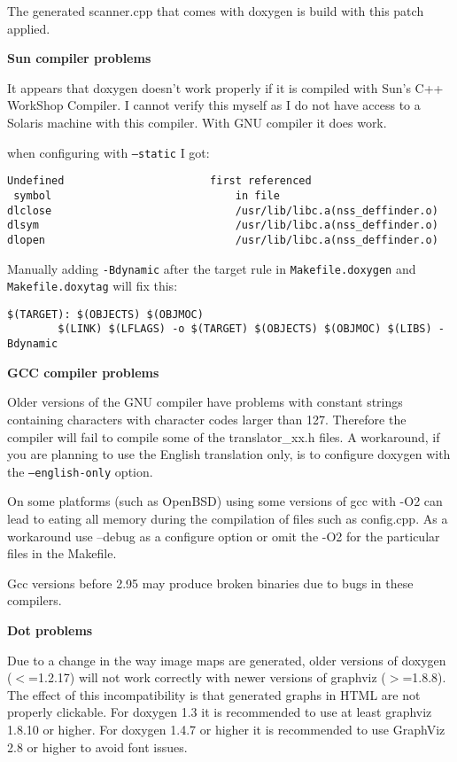 The generated scanner.cpp that comes with doxygen is build with this patch applied.

{\bf Sun compiler problems}

It appears that doxygen doesn't work properly if it is compiled with Sun's C++ WorkShop Compiler. I cannot verify this myself as I do not have access to a Solaris machine with this compiler. With GNU compiler it does work.

when configuring with {\tt --static} I got:



\footnotesize\begin{verbatim}
Undefined                       first referenced
 symbol                             in file
dlclose                             /usr/lib/libc.a(nss_deffinder.o)
dlsym                               /usr/lib/libc.a(nss_deffinder.o)
dlopen                              /usr/lib/libc.a(nss_deffinder.o)
\end{verbatim}
\normalsize


Manually adding {\tt -Bdynamic} after the target rule in {\tt Makefile.doxygen} and {\tt Makefile.doxytag} will fix this:



\footnotesize\begin{verbatim}
$(TARGET): $(OBJECTS) $(OBJMOC) 
        $(LINK) $(LFLAGS) -o $(TARGET) $(OBJECTS) $(OBJMOC) $(LIBS) -Bdynamic
\end{verbatim}
\normalsize


{\bf GCC compiler problems}

Older versions of the GNU compiler have problems with constant strings containing characters with character codes larger than 127. Therefore the compiler will fail to compile some of the translator\_\-xx.h files. A workaround, if you are planning to use the English translation only, is to configure doxygen with the {\tt --english-only} option.

On some platforms (such as OpenBSD) using some versions of gcc with -O2 can lead to eating all memory during the compilation of files such as config.cpp. As a workaround use --debug as a configure option or omit the -O2 for the particular files in the Makefile.

Gcc versions before 2.95 may produce broken binaries due to bugs in these compilers.

{\bf Dot problems}

Due to a change in the way image maps are generated, older versions of doxygen ($<$=1.2.17) will not work correctly with newer versions of graphviz ($>$=1.8.8). The effect of this incompatibility is that generated graphs in HTML are not properly clickable. For doxygen 1.3 it is recommended to use at least graphviz 1.8.10 or higher. For doxygen 1.4.7 or higher it is recommended to use GraphViz 2.8 or higher to avoid font issues.

